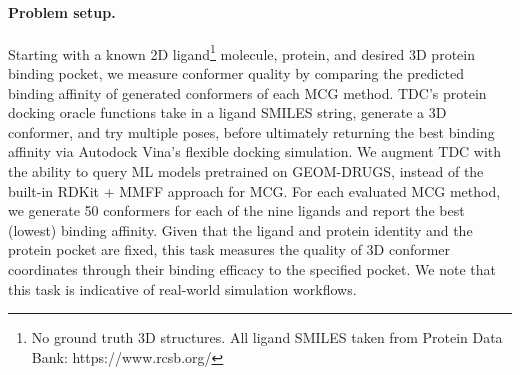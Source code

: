 \paragraph{Problem setup.} Starting with a known 2D ligand\footnote{No ground truth 3D structures. All ligand SMILES taken from Protein Data Bank: https://www.rcsb.org/} molecule, protein, and desired 3D protein binding pocket, we measure conformer quality by comparing the predicted binding affinity of generated conformers of each MCG method.
TDC's protein docking oracle functions take in a ligand SMILES string, generate a 3D conformer, and try multiple poses, before ultimately returning the best binding affinity via Autodock Vina's flexible docking simulation.
We augment TDC with the ability to query ML models pretrained on GEOM-DRUGS, instead of the built-in RDKit + MMFF approach for MCG.
For each evaluated MCG method, we generate 50 conformers for each of the nine ligands and report the best (lowest) binding affinity.
Given that the ligand and protein identity and the protein pocket are fixed, this task measures the quality of 3D conformer coordinates through their binding efficacy to the specified pocket. We note that this task is indicative of real-world simulation workflows.


